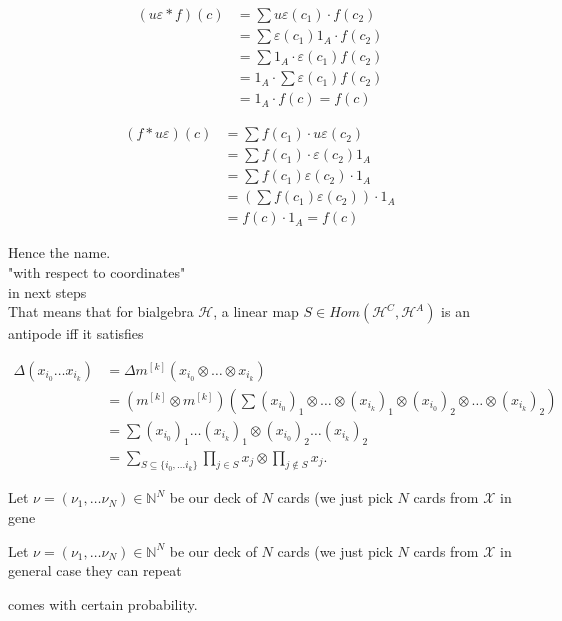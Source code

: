 \documentclass[a4paper]{article}
\begin{document}
\begin{align*}
(u\varepsilon *f)(c) &= \sum u\varepsilon(c_1) \cdot f(c_2) \\
&= \sum \varepsilon(c_1)1_A \cdot f(c_2) \\
&= \sum 1_A \cdot \varepsilon(c_1)f(c_2) \\
&= 1_A \cdot \sum \varepsilon(c_1)f(c_2) \\
&= 1_A \cdot f(c) = f(c)
\end{align*}

\begin{align*}
(f * u\varepsilon)(c) &= \sum f(c_1) \cdot u\varepsilon(c_2) \\
&= \sum f(c_1) \cdot \varepsilon(c_2)1_A \\
&= \sum f(c_1)\varepsilon(c_2) \cdot 1_A \\
&= \left(\sum f(c_1)\varepsilon(c_2)\right)\cdot 1_A \\
&= f(c) \cdot 1_A = f(c)
\end{align*}


Hence the name. \\

"with respect to coordinates" \\

in next steps \\

That means that for bialgebra $\mathcal{H}$, a linear map $S \in Hom(\mathcal{H}^C, \mathcal{H}^A)$
is an antipode iff it satisfies

\begin{align*}
\Delta(x_{i_0}\dots x_{i_k}) &= \Delta m^{[k]}(x_{i_0} \otimes \dots \otimes x_{i_k}) \\
&= (m^{[k]} \otimes m^{[k]}) \left(\sum (x_{i_0})_1 \otimes \dots \otimes (x_{i_k})_1 \otimes
(x_{i_0})_2 \otimes \dots \otimes (x_{i_k})_2\right) \\
&= \sum (x_{i_0})_1 \dots (x_{i_k})_1 \otimes
(x_{i_0})_2 \dots (x_{i_k})_2 \\
&= \sum_{S \subseteq \{i_0, \dots i_k\}} \prod_{j \in S} x_j \otimes \prod_{j \notin S} x_j.
\end{align*}

Let $\nu = (\nu_1, \dots \nu_N) \in \mathbb{N}^N$ be our deck of $N$ cards (we just pick $N$ cards from
$\mathcal{X}$ in gene

Let $\nu = (\nu_1, \dots \nu_N) \in \mathbb{N}^N$ be our deck of $N$ cards (we just pick $N$ cards from
$\mathcal{X}$ in general case they can repeat

 comes with certain probability.
\end{document}
